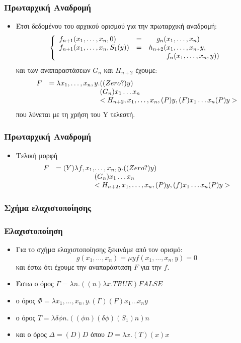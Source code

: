 \documentclass{beamer}
\begin{document}
\begin{frame}
  \frametitle{Πρωταρχική Αναδρομή}
  \begin{itemize}
  \item Έτσι δεδομένου του αρχικού ορισμού για την πρωταρχική αναδρομή:
    $$\left\{
    \begin{array}{llr@{}l}
      f_{n+1}(x_1,\ldots,x_n, 0)     &=&    g_n(&x_1,\ldots,x_n) \\
      f_{n+1}(x_1,\ldots,x_n, S_1(y))&=&h_{n+2}(&x_1,\ldots,x_n, y ,\\
      & &        &f_n(x_1,\ldots,x_n, y))
    \end{array}
    \right.$$
    και των αναπαραστάσεων $G_n$ και $H_{n+2}$
    \pause
    έχουμε:
    $$
    \begin{array}{lr@{}l}
      F &= \lambda x_1,\ldots ,x_n, y .&((Zero?)y) \\
      & &(G_n)x_1 \ldots x_n \\
      & &<H_{n+2},x_1,\ldots,x_n,(P)y,(F)x_1 \ldots x_n (P)y>
    \end{array}
    $$
    \pause
    που λύνεται με τη χρήση του Y τελεστή.
  \end{itemize}
\end{frame}

\begin{frame}
  \frametitle{Πρωταρχική Αναδρομή}
  \begin{itemize}
  \item Τελική μορφή
    $$
    \begin{array}{lr@{}l}
    F &= (Y)\lambda f,x_1,&\ldots ,x_n, y .((Zero?)y) \\
    & &(G_n)x_1 \ldots x_n \\
    & &<H_{n+2},x_1,\ldots,x_n,(P)y,(f)x_1 \ldots x_n (P)y>
    \end{array}
    $$
  \end{itemize}
\end{frame}

\subsubsection{Σχήμα ελαχιστοποίησης}

\begin{frame}
  \frametitle{Ελαχιστοποίηση}
  \begin{itemize}
  \item Για το σχήμα ελαχιστοποίησης ξεκινάμε από τον ορισμό:
    $$g(x_1,\ldots,x_n) = \mu y {f(x_1,\ldots,x_n,y)=0}$$ και έστω ότι
    έχουμε την αναπαράσταση $F$ για την $f$.  \pause
  \item Έστω ο όρος $\Gamma = \lambda n. ((n) \lambda x. TRUE) FALSE$
    \pause
  \item ο όρος $\Phi = \lambda x_1,\ldots,x_n,y . (\Gamma) (F) x_1
    \ldots x_n y$ \pause
  \item ο όρος $ T = \lambda \delta \phi n . ((\phi n)(\delta \phi)
    (S_1) n) n$ \pause
  \item και ο όρος $\Delta = (D)D$ όπου $D = \lambda x . (T) (x) x$
  \end{itemize}
\end{frame}
\end{document}
